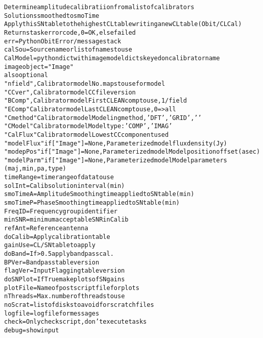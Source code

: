 \begin{boxedminipage}{\textwidth}
\begin{alltt}
Determine amplitude calibratiion from a list of calibrators
Solutions smoothed to smoTime
Apply this SN table to the highest CL table writing a new CL table (Obit/CLCal)
Returns task error code, 0=OK, else failed
err        = Python Obit Error/message stack
calSou     = Source name or list of names to use
CalModel = python dict with image model dicts keyed on calibrator name
           image object = "Image"
           also optional
           "nfield",    Calibrator model  No. maps to use for model
           "CCver",     Calibrator model CC file version
           "BComp",     Calibrator model First CLEAN comp to use, 1/field
           "EComp"      Calibrator model  Last CLEAN comp to use, 0={\textgreater}all
           "Cmethod"    Calibrator model Modeling method, 'DFT','GRID','    '
           "CModel"     Calibrator model Model type: 'COMP','IMAG'
           "CalFlux"    Calibrator model  Lowest CC component used
           "modelFlux"  if ["Image"]=None, Parameterized model flux density (Jy)
           "modepPos"   if ["Image"]=None, Parameterized model Model position offset (asec)
           "modelParm"  if ["Image"]=None, Parameterized model Model parameters
                        (maj, min, pa, type)
timeRange  = timerange of data to use
solInt     = Calib solution interval (min)
smoTimeA   = Amplitude Smoothing time applied to SN table (min)
smoTimeP   = Phase Smoothing time applied to SN table (min)
FreqID     = Frequency group identifier
minSNR     = minimum acceptable SNR in Calib
refAnt     = Reference antenna
doCalib    = Apply calibration table
gainUse    = CL/SN table to apply
doBand     = If {\textgreater}0.5 apply bandpass cal.
BPVer      = Bandpass table version
flagVer    = Input Flagging table version
doSNPlot   = If True make plots of SN gains
plotFile   = Name of postscript file for plots
nThreads   = Max. number of threads to use
noScrat    = list of disks to avoid for scratch files
logfile    = logfile for messages
check      = Only check script, don't execute tasks
debug      = show input\end{alltt}

    \vspace{1ex}

    \end{boxedminipage}

    \label{VLBACal:VLBAApplyCal}
    \vspace{0.5ex}

